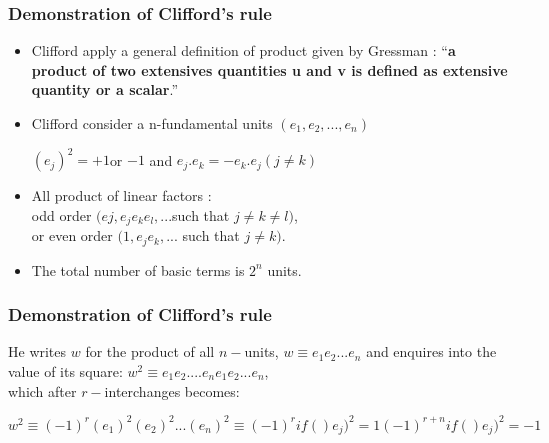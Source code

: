 \label{columns}
\begin{frame}\frametitle{Demonstration of Clifford’s rule }

\begin{itemize}
	\item 
Clifford apply a general definition of product given by Gressman : “\textbf{a product of two extensives quantities u and v is defined as extensive quantity or a scalar}.”


	\item 

Clifford consider a n-fundamental units $(e_1,e_2,...,e_n)$ \\

\begin{center}
	$(e_j)^2=+1$or $-1$  and $e_j.e_k=-e_k.e_j (j \neq k)$ 
\end{center}
	\item 
All product of linear factors : \\odd order $(ej, e_j e_k e_l, ... $such that $j \neq k \neq l)$,
\\or  even order $( 1, e_j e_k, ...$ such that $j \neq k)$. \\


	\item 
The total number of basic terms is $2^n$ units.


\end{itemize}

\end{frame}


\begin{frame}\frametitle{Demonstration of Clifford’s rule }

He writes $w$ for the product of all $n-$units, $w \equiv e_1 e_2...e_n$ and enquires into the value of its square:
$w^2 \equiv e_1 e_2....e_n e_1 e_2...e_n$,\\
which after $r-$interchanges becomes:   

$w^2 \equiv  (-1)^r (e_{1})^2 (e_{2})^2 ...(e_{n})^2  \equiv (-1)^r if ()e_j)^2=1 (-1)^{r+n} if ()e_j)^2=-1$

\end{frame}



